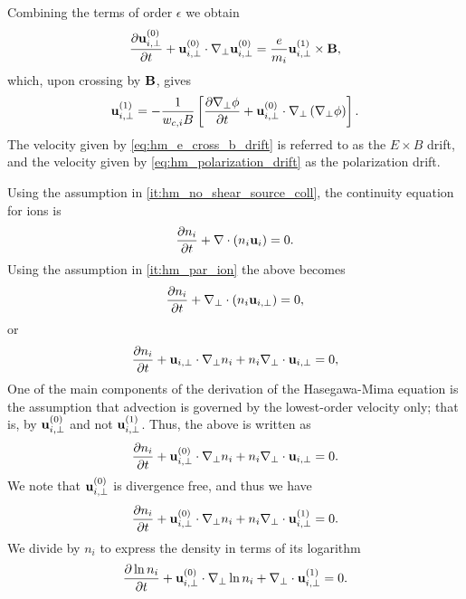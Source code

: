 \documentclass[oneside,a4paper,11pt]{report}
\begin{document}
Combining the terms of order $\epsilon$ we obtain
\begin{equation}
    \frac{\partial \mathbf{u}_{i,\perp}^{(0)}}{\partial t} + \mathbf{u}_{i,\perp}^{(0)} \cdot \nabla_\perp \mathbf{u}_{i,\perp}^{(0)} = \frac{e}{m_i} \mathbf{u}_{i,\perp}^{(1)} \times \mathbf{B},
\end{equation}
which, upon crossing by $\mathbf{B}$, gives
\begin{equation}
\label{eq:hm_polarization_drift}
    \mathbf{u}_{i,\perp}^{(1)} = -\frac{1}{w_{c,i} B} \left [ \frac{\partial \nabla_\perp \phi}{\partial t} + \mathbf{u}_{i,\perp}^{(0)} \cdot \nabla_\perp \left ( \nabla_\perp \phi \right ) \right ].
\end{equation}
The velocity given by \cref{eq:hm_e_cross_b_drift} is referred to as the $E \times B$ drift, and the velocity given by \cref{eq:hm_polarization_drift} as the polarization drift.

Using the assumption in \cref{it:hm_no_shear_source_coll}, the continuity equation for ions is
\begin{equation}
    \frac{\partial n_i}{\partial t} + \nabla \cdot (n_i \mathbf{u}_i) = 0.
\end{equation}
Using the assumption in \cref{it:hm_par_ion} the above becomes
\begin{equation}
    \frac{\partial n_i}{\partial t} + \nabla_\perp \cdot (n_i \mathbf{u}_{i,\perp}) = 0,
\end{equation}
or
\begin{equation}
    \frac{\partial n_i}{\partial t} +  \mathbf{u}_{i,\perp} \cdot \nabla_\perp n_i + n_i \nabla_\perp \cdot \mathbf{u}_{i,\perp} = 0,
\end{equation}
One of the main components of the derivation of the Hasegawa-Mima equation is the assumption that advection is governed by the lowest-order velocity only; that is, by $\mathbf{u}^{(0)}_{i,\perp}$ and not $\mathbf{u}^{(1)}_{i,\perp}$. Thus, the above is written as
\begin{equation}
    \frac{\partial n_i}{\partial t} +  \mathbf{u}^{(0)}_{i,\perp} \cdot \nabla_\perp n_i + n_i \nabla_\perp \cdot \mathbf{u}_{i,\perp} = 0.
\end{equation}
We note that $\mathbf{u}^{(0)}_{i,\perp}$ is divergence free, and thus we have
\begin{equation}
    \frac{\partial n_i}{\partial t} +  \mathbf{u}^{(0)}_{i,\perp} \cdot \nabla_\perp n_i + n_i \nabla_\perp \cdot \mathbf{u}^{(1)}_{i,\perp} = 0.
\end{equation}
We divide by $n_i$ to express the density in terms of its logarithm 
\begin{equation}
    \label{eq:intermediate_hm_1}
    \frac{\partial \ln n_i}{\partial t} + \mathbf{u}^{(0)}_{i,\perp} \cdot \nabla_\perp \ln n_i + \nabla_\perp \cdot \mathbf{u}^{(1)}_{i,\perp} = 0.
\end{equation}
\end{document}
